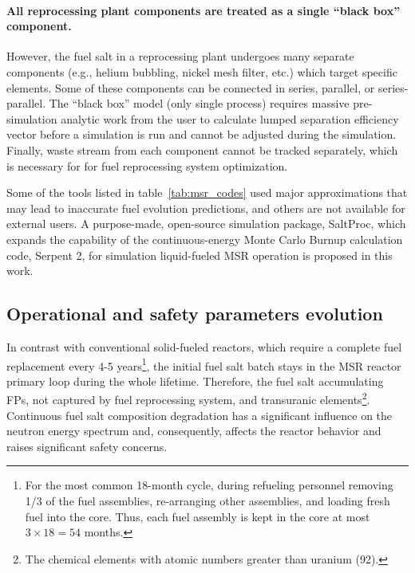 \paragraph{All reprocessing plant components are treated as a single ``black 
box'' component.} However, the fuel salt in a reprocessing plant undergoes 
many separate components (e.g., helium bubbling, nickel mesh filter, etc.) 
which target specific elements. Some of these components can be connected in 
series, parallel, or series-parallel. The ``black box'' model (only single 
process) requires massive pre-simulation analytic work from the user to 
calculate lumped separation efficiency vector before a simulation is run and 
cannot be adjusted during the simulation.	Finally, waste stream from each 
component cannot be tracked separately, which is necessary for for fuel 
reprocessing system optimization.

Some of the tools listed in table~\ref{tab:msr_codes} used major 
approximations that may lead to inaccurate fuel evolution predictions, and 
others are not available for external users. A purpose-made, open-source 
simulation package, SaltProc, which expands the capability of the 
continuous-energy Monte Carlo Burnup calculation code, Serpent 2, for 
simulation liquid-fueled \gls{MSR} operation is proposed in this work.

\subsection{Operational and safety parameters evolution}
In contrast with conventional solid-fueled reactors, which require a 
complete fuel replacement every 4-5 years\footnote{For the most common 
18-month cycle, during refueling personnel removing 1/3 of the fuel 
assemblies, re-arranging other assemblies, and loading fresh fuel into the 
core. Thus, each fuel assembly is kept in the core at most $3\times 18=54$ 
months.}, the initial fuel salt batch stays in the \gls{MSR} reactor primary 
loop during the whole lifetime. Therefore, the fuel salt accumulating 
\glspl{FP}, not captured by fuel reprocessing system, and transuranic 
elements\footnote{The chemical elements with atomic numbers greater than 
uranium (92).}. Continuous fuel salt composition degradation has a 
significant influence on the neutron energy spectrum and, consequently, 
affects the reactor behavior and raises significant safety concerns.

